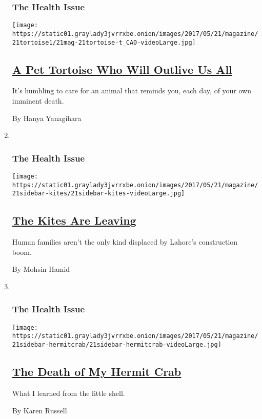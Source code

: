 \begin{enumerate}
{  \subsubsection{The Health Issue}\label{the-health-issue-6}}

  \texttt{[image: https://static01.graylady3jvrrxbe.onion/images/2017/05/21/magazine/21tortoise1/21mag-21tortoise-t\_CA0-videoLarge.jpg]}

  \hypertarget{a-pet-tortoise-who-will-outlive-us-all}{%
  \subsection{\texorpdfstring{\href{/2017/05/17/magazine/a-pet-tortoise-who-will-outlive-us-all.html}{A
  Pet Tortoise Who Will Outlive Us
  All}}{A Pet Tortoise Who Will Outlive Us All}}\label{a-pet-tortoise-who-will-outlive-us-all}}

  It's humbling to care for an animal that reminds you, each day, of
  your own imminent death.

  By Hanya Yanagihara
\item ~
  \hypertarget{the-health-issue-7}{%
  \subsubsection{The Health Issue}\label{the-health-issue-7}}

  \texttt{[image: https://static01.graylady3jvrrxbe.onion/images/2017/05/21/magazine/21sidebar-kites/21sidebar-kites-videoLarge.jpg]}

  \hypertarget{the-kites-are-leaving}{%
  \subsection{\texorpdfstring{\href{/2017/05/17/magazine/the-kites-are-leaving.html}{The
  Kites Are
  Leaving}}{The Kites Are Leaving}}\label{the-kites-are-leaving}}

  Human families aren't the only kind displaced by Lahore's construction
  boom.

  By Mohsin Hamid
\item ~
  \hypertarget{the-health-issue-8}{%
  \subsubsection{The Health Issue}\label{the-health-issue-8}}

  \texttt{[image: https://static01.graylady3jvrrxbe.onion/images/2017/05/21/magazine/21sidebar-hermitcrab/21sidebar-hermitcrab-videoLarge.jpg]}

  \hypertarget{the-death-of-my-hermit-crab}{%
  \subsection{\texorpdfstring{\href{/2017/05/17/magazine/the-death-of-my-hermit-crab.html}{The
  Death of My Hermit
  Crab}}{The Death of My Hermit Crab}}\label{the-death-of-my-hermit-crab}}

  What I learned from the little shell.

  By Karen Russell
\end{enumerate}


